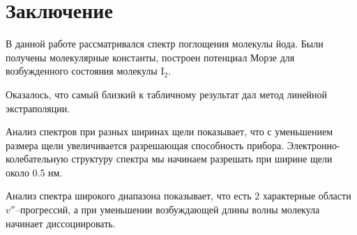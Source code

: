\section{Заключение}
В данной работе рассматривался спектр поглощения молекулы йода. Были получены молекулярные константы, построен потенциал Морзе для возбужденного состояния молекулы $\text{I}_2$.

Оказалось, что самый близкий к табличному результат дал метод линейной экстраполяции. 

Анализ спектров при разных ширинах щели показывает, что с уменьшением размера щели увеличивается разрешающая способность прибора. Электронно-колебательную структуру спектра мы начинаем разрешать при ширине щели около 0.5 нм.

Анализ спектра широкого диапазона показывает, что есть 2 характерные области $v''$--прогрессий, а при уменьшении возбуждающей длины волны молекула начинает диссоциировать.